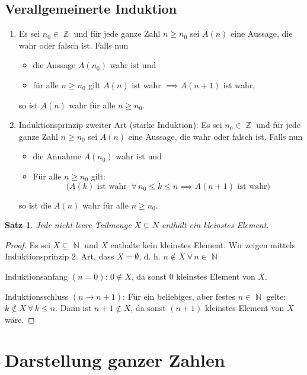 \documentclass[a4paper,12pt]{article}
\DeclareMathOperator{\N}{\mathbb N}
\DeclareMathOperator{\Z}{\mathbb Z}
\newtheorem{satz}[axiom]{Satz}
\theoremstyle{definition}
\let\oldforall\forall
\renewcommand{\forall}{\:\oldforall \, }
\begin{document}
	\subsection{Verallgemeinerte Induktion}
	\begin{enumerate}[label=(\roman*)]
		\item Es sei $n_0 \in \Z$ und für jede ganze Zahl $n \geq n_0$ sei $A(n)$ eine Aussage, die wahr oder falsch ist. Falls nun
		\begin{itemize}
			\item die Aussage $A(n_0)$ wahr ist und
			\item für alle $n \geq n_0$ gilt $A(n)$ ist wahr $\implies A(n+1)$ ist wahr,
		\end{itemize}
		so ist $A(n)$ wahr für alle $n\geq n_0$.
		\item Induktionsprinzip zweiter Art (\glqq starke Induktion\grqq):
		Es sei $n_0 \in \Z$ und für jede ganze Zahl $n \geq n_0$ sei $A(n)$ eine Aussage, die wahr oder falsch ist. Falls nun
		\begin{itemize}
			\item die Annahme $A(n_0)$ wahr ist und
			\item Für alle $n\geq n_0$ gilt:
			\[
				\big(A(k) \text{ ist wahr } \forall n_0 \leq k \leq n \implies A(n+1) \text{ ist wahr}\big)
			\]
		\end{itemize}
		so ist die $A(n)$ wahr für alle $n\geq n_0$.
	\end{enumerate}
	\begin{satz}
		Jede nicht-leere Teilmenge $X \subseteq N$ enthält ein kleinstes Element.
	\end{satz}
	\begin{proof}
		Es sei $X \subseteq \N$ und $X$ enthalte kein kleinstes Element. Wir zeigen mittels Induktionsprinzip 2. Art, dass $X = \emptyset$, d. h. $n \notin X \forall n \in \N$
		
		Induktionsanfang $(n = 0)$: $0 \notin X$, da sonst $0$ kleinstes Element von $X$.
		
		Induktionsschluss $(n \to n+1)$: Für ein beliebiges, aber festes $n \in \N$ gelte: $k \notin X \forall k \leq n$. Dann ist $n+1 \notin X$, da sonst $(n+1)$ kleinstes Element von $X$ wäre.
	\end{proof}
	
	\section{Darstellung ganzer Zahlen}
\end{document}
